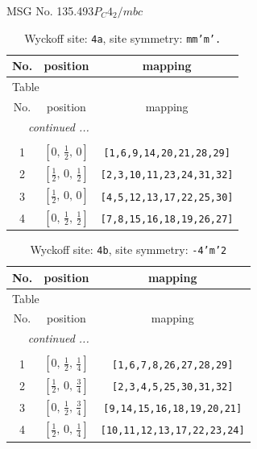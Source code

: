 \documentclass[fleqn,8pt]{jsarticle}
\begin{document}
\setcounter{MaxMatrixCols}{32}

\renewcommand{\tablename}{Table~}
\renewcommand{\figurename}{Figure~}
\begin{center}
\LARGE
MSG No. 135.493\quad$P_{C}4_{2}/mbc$
\end{center}
\renewcommand{\arraystretch}{1.2}
\begin{longtable}{ccc}
\caption{Wyckoff site: {\tt 4a}, site symmetry: {\tt mm'm'.}}
 \\
 \hline \hline
No. & position & mapping \\ \hline \endfirsthead

\multicolumn{2}{l}{\tablename\ \thetable{}} \\
 \hline \hline
No. & position & mapping \\ \hline \endhead

 \hline \hline
\multicolumn{2}{r}{\footnotesize\it continued ...} \\ \endfoot

 \hline \hline
\multicolumn{2}{r}{} \\ \endlastfoot

1 & $\left[ 0,\, \frac{1}{2},\, 0 \right]$ & {\tt [1,6,9,14,20,21,28,29]} \\ \hline
2 & $\left[ \frac{1}{2},\, 0,\, \frac{1}{2} \right]$ & {\tt [2,3,10,11,23,24,31,32]} \\ \hline
3 & $\left[ \frac{1}{2},\, 0,\, 0 \right]$ & {\tt [4,5,12,13,17,22,25,30]} \\ \hline
4 & $\left[ 0,\, \frac{1}{2},\, \frac{1}{2} \right]$ & {\tt [7,8,15,16,18,19,26,27]} \\
\end{longtable}
\renewcommand{\arraystretch}{1.2}
\begin{longtable}{ccc}
\caption{Wyckoff site: {\tt 4b}, site symmetry: {\tt -4'm'2}}
 \\
 \hline \hline
No. & position & mapping \\ \hline \endfirsthead

\multicolumn{2}{l}{\tablename\ \thetable{}} \\
 \hline \hline
No. & position & mapping \\ \hline \endhead

 \hline \hline
\multicolumn{2}{r}{\footnotesize\it continued ...} \\ \endfoot

 \hline \hline
\multicolumn{2}{r}{} \\ \endlastfoot

1 & $\left[ 0,\, \frac{1}{2},\, \frac{1}{4} \right]$ & {\tt [1,6,7,8,26,27,28,29]} \\ \hline
2 & $\left[ \frac{1}{2},\, 0,\, \frac{3}{4} \right]$ & {\tt [2,3,4,5,25,30,31,32]} \\ \hline
3 & $\left[ 0,\, \frac{1}{2},\, \frac{3}{4} \right]$ & {\tt [9,14,15,16,18,19,20,21]} \\ \hline
4 & $\left[ \frac{1}{2},\, 0,\, \frac{1}{4} \right]$ & {\tt [10,11,12,13,17,22,23,24]} \\
\end{longtable}
\end{document}
